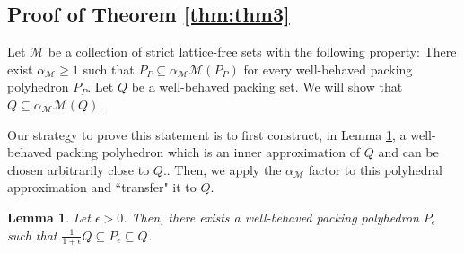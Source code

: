 \documentclass[11pt]{article}
\newcommand{\Z}{\mathbb{Z}}
\newcommand{\seq}{\subseteq}
\newcommand{\Mset}{M}
\newcommand{\M}{\mathcal{\Mset}}
\newtheorem{lemma}{Lemma}
\newcommand{\cred}{\color{black}}
\begin{document}
\subsection{Proof of Theorem \ref{thm:thm3}}
\label{subsec:4.3}

Let $\M$ be a collection of strict lattice-free sets with the following property: There exist $\alpha_\M \geq 1$ such that $P_P \seq \alpha_\M \M(P_P)$ for every well-behaved packing polyhedron $P_P$. Let $Q$ be a well-behaved packing set. We will show that $Q \seq \alpha_\M \M(Q)$.

Our strategy to prove this statement is to first construct, in Lemma \ref{prop:SantanuLemma}, a well-behaved packing polyhedron which is an inner approximation of $Q$ and {\cred can be chosen} arbitrarily close to $Q$.. Then, we apply the $\alpha_\M$ factor to this polyhedral approximation and ``transfer" it to $Q$. 

\begin{lemma}
\label{prop:SantanuLemma} 
Let $\epsilon > 0$. Then, there exists a well-behaved packing polyhedron $P_\epsilon$ such that 
$\frac{1}{1+\epsilon} Q \subseteq P_\epsilon \subseteq Q$. 
\end{lemma}
\end{document}
